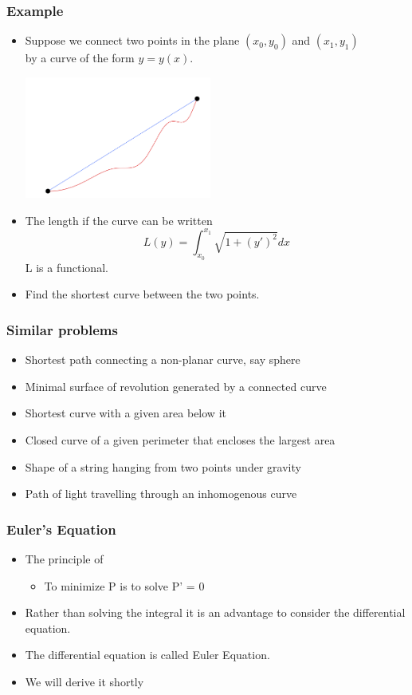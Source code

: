 \documentclass[10pt]{beamer}
\begin{document}
\begin{frame}
  \frametitle{Example}
  \begin{itemize}
  \item Suppose we connect two points in the plane $(x_0, y_0)$ and
    $(x_1, y_1)$ \\by a curve of the form $y = y(x)$.
    
    \centerline{\includegraphics[height=4cm]{basic-curve}}
    
  \item The length if the curve can be written
    \[ L(y) = \int_{x_0}^{x_1} \sqrt{1 + (y')^2} dx \]
    L is a functional. 
  \item Find the shortest curve between the two points. 
  \end{itemize}
\end{frame}

\begin{frame}
  \frametitle{Similar problems}
  \begin{itemize}
  \item Shortest path connecting a non-planar curve, say sphere
  \item Minimal surface of revolution generated by a connected curve
  \item Shortest curve with a given area below it
  \item Closed curve of a given perimeter that encloses the largest area
  \item Shape of a string hanging from two points under gravity
  \item Path of light travelling through an inhomogenous curve
  \end{itemize}
\end{frame}


\begin{frame}
  \frametitle{Euler's Equation}
  \begin{itemize}
  \item The principle of 
    \begin{itemize}
    \item To minimize P is to solve P' = 0
    \end{itemize}
  \item Rather than solving the integral it is an advantage to
    consider the differential equation. 
  \item The differential equation is called Euler Equation. 
  \item We will derive it shortly
  \end{itemize}
\end{frame}
\end{document}
